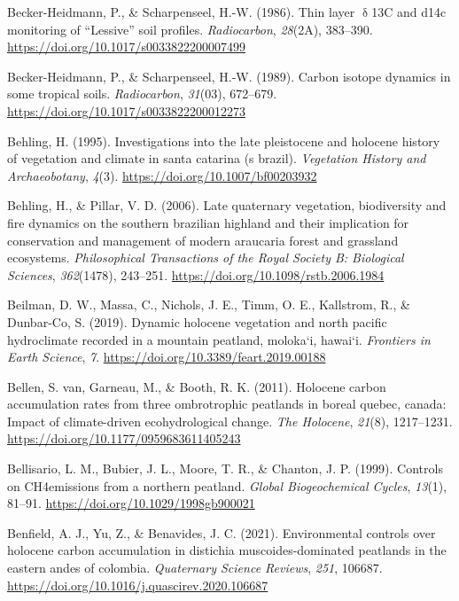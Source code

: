 \documentclass[]{article}
\begin{document}
\leavevmode\hypertarget{ref-Becker_Heidmann_1986}{}%
Becker-Heidmann, P., \& Scharpenseel, H.-W. (1986). Thin layer
\(\updelta\)13C and d14c monitoring of ``Lessive'' soil profiles.
\emph{Radiocarbon}, \emph{28}(2A), 383--390.
\url{https://doi.org/10.1017/s0033822200007499}

\leavevmode\hypertarget{ref-Becker_Heidmann_1989}{}%
Becker-Heidmann, P., \& Scharpenseel, H.-W. (1989). Carbon isotope
dynamics in some tropical soils. \emph{Radiocarbon}, \emph{31}(03),
672--679. \url{https://doi.org/10.1017/s0033822200012273}

\leavevmode\hypertarget{ref-Behling_1995}{}%
Behling, H. (1995). Investigations into the late pleistocene and
holocene history of vegetation and climate in santa catarina (s brazil).
\emph{Vegetation History and Archaeobotany}, \emph{4}(3).
\url{https://doi.org/10.1007/bf00203932}

\leavevmode\hypertarget{ref-Behling_2006}{}%
Behling, H., \& Pillar, V. D. (2006). Late quaternary vegetation,
biodiversity and fire dynamics on the southern brazilian highland and
their implication for conservation and management of modern araucaria
forest and grassland ecosystems. \emph{Philosophical Transactions of the
Royal Society B: Biological Sciences}, \emph{362}(1478), 243--251.
\url{https://doi.org/10.1098/rstb.2006.1984}

\leavevmode\hypertarget{ref-Beilman_2019}{}%
Beilman, D. W., Massa, C., Nichols, J. E., Timm, O. E., Kallstrom, R.,
\& Dunbar-Co, S. (2019). Dynamic holocene vegetation and north pacific
hydroclimate recorded in a mountain peatland, moloka`i, hawai`i.
\emph{Frontiers in Earth Science}, \emph{7}.
\url{https://doi.org/10.3389/feart.2019.00188}

\leavevmode\hypertarget{ref-van_Bellen_2011}{}%
Bellen, S. van, Garneau, M., \& Booth, R. K. (2011). Holocene carbon
accumulation rates from three ombrotrophic peatlands in boreal quebec,
canada: Impact of climate-driven ecohydrological change. \emph{The
Holocene}, \emph{21}(8), 1217--1231.
\url{https://doi.org/10.1177/0959683611405243}

\leavevmode\hypertarget{ref-Bellisario_1999}{}%
Bellisario, L. M., Bubier, J. L., Moore, T. R., \& Chanton, J. P.
(1999). Controls on CH4emissions from a northern peatland. \emph{Global
Biogeochemical Cycles}, \emph{13}(1), 81--91.
\url{https://doi.org/10.1029/1998gb900021}

\leavevmode\hypertarget{ref-Benfield_2021}{}%
Benfield, A. J., Yu, Z., \& Benavides, J. C. (2021). Environmental
controls over holocene carbon accumulation in distichia
muscoides-dominated peatlands in the eastern andes of colombia.
\emph{Quaternary Science Reviews}, \emph{251}, 106687.
\url{https://doi.org/10.1016/j.quascirev.2020.106687}
\end{document}
